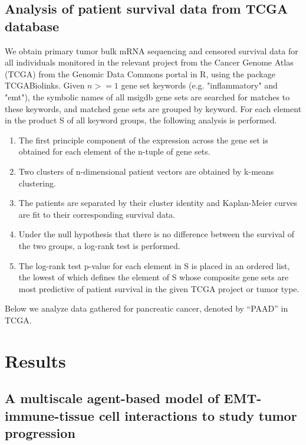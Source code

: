 \documentclass[11pt]{article}
\begin{document}
\subsection{Analysis of patient survival data from TCGA database}
We obtain primary tumor bulk mRNA sequencing and censored survival data for all individuals monitored in the relevant project from the Cancer Genome Atlas (TCGA) from the Genomic Data Commons portal in R, using the package TCGABiolinks.  Given $n >= 1$ gene set keywords (e.g. "inflammatory" and "emt"), the symbolic names of all msigdb gene sets are searched for matches to these keywords, and matched gene sets are grouped by keyword. For each element in the product S of all keyword groups, the following analysis is performed.
\begin{enumerate}
     \item The first principle component of the expression across the gene set is obtained for each element of the n-tuple of gene sets.
     \item Two clusters of n-dimensional patient vectors are obtained by k-means clustering.
     \item The patients are separated by their cluster identity and Kaplan-Meier curves are fit to their corresponding survival data.
     \item Under the null hypothesis that there is no difference between the survival of the two groups, a log-rank test is performed.
     \item The log-rank test p-value for each element in S is placed in an ordered list, the lowest of which defines the element of S whose composite gene sets are most predictive of patient survival in the given TCGA project or tumor type.
\end{enumerate}
Below we analyze data gathered for pancreatic cancer, denoted by ``PAAD'' in TCGA.     


\section{Results}

\subsection{A multiscale agent-based model of EMT-immune-tissue cell interactions to study tumor progression}\label{ExplModel}
\end{document}
